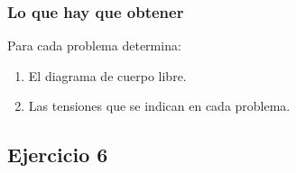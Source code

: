 \documentclass[12pt]{beamer}
\begin{document}
\begin{frame}
\frametitle{Lo que hay que obtener}
Para cada problema determina:
\pause
{}
\begin{enumerate}[<+->]
\item El diagrama de cuerpo libre.
\item Las tensiones que se indican en cada problema.
\end{enumerate}
\end{frame}

\subsection*{Ejercicio 6}
\end{document}
